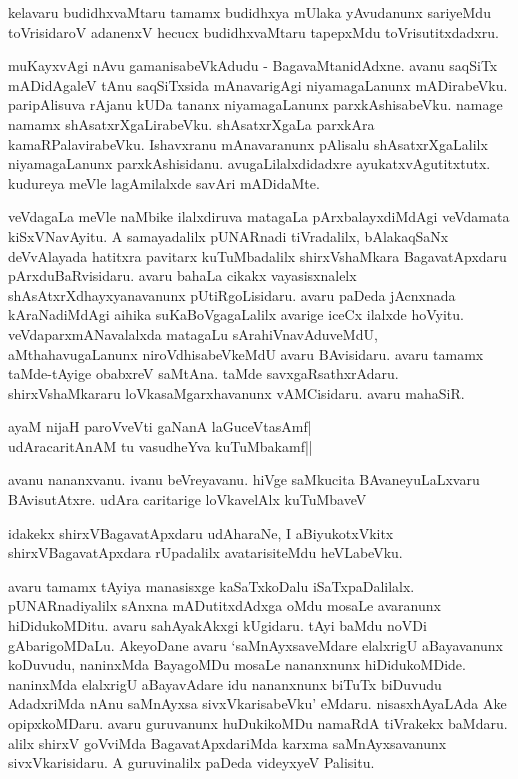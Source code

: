 kelavaru budidhxvaMtaru tamamx budidhxya mUlaka yAvudanunx sariyeMdu toVrisidaroV adanenxV hecucx budidhxvaMtaru tapepxMdu toVrisutitxdadxru.

muKayxvAgi nAvu gamanisabeVkAdudu - BagavaMtanidAdxne. avanu saqSiTx mADidAgaleV tAnu saqSiTxsida mAnavarigAgi niyamagaLanunx mADirabeVku. paripAlisuva rAjanu kUDa tananx niyamagaLanunx parxkAshisabeVku. namage namamx shAsatxrXgaLirabeVku. shAsatxrXgaLa parxkAra kamaRPalavirabeVku. Ishavxranu mAnavaranunx pAlisalu shAsatxrXgaLalilx niyamagaLanunx parxkAshisidanu. avugaLilalxdidadxre ayukatxvAgutitxtutx. kudureya meVle lagAmilalxde savAri mADidaMte.

veVdagaLa meVle naMbike ilalxdiruva matagaLa pArxbalayxdiMdAgi veVdamata kiSxVNavAyitu. A samayadalilx pUNARnadi tiVradalilx, bAlakaqSaNx deVvAlayada hatitxra pavitarx kuTuMbadalilx shirxVshaMkara BagavatApxdaru pArxduBaRvisidaru. avaru bahaLa cikakx vayasisxnalelx shAsAtxrXdhayxyanavanunx pUtiRgoLisidaru. avaru paDeda jAcnxnada kAraNadiMdAgi aihika suKaBoVgagaLalilx avarige iceCx ilalxde hoVyitu. veVdaparxmANavalalxda matagaLu sArahiVnavAduveMdU, aMthahavugaLanunx niroVdhisabeVkeMdU avaru BAvisidaru. avaru tamamx taMde-tAyige obabxreV saMtAna. taMde savxgaRsathxrAdaru. shirxVshaMkararu loVkasaMgarxhavanunx vAMCisidaru. avaru mahaSiR.

\begin{shloka}
ayaM nijaH paroVveVti gaNanA laGuceVtasAmf|\\
udAracaritAnAM tu vasudheYva kuTuMbakamf||
\end{shloka}

avanu nananxvanu. ivanu beVreyavanu. hiVge saMkucita BAvaneyuLaLxvaru BAvisutAtxre. udAra caritarige loVkavelAlx kuTuMbaveV

idakekx shirxVBagavatApxdaru udAharaNe, I aBiyukotxVkitx shirxVBagavatApxdara rUpadalilx avatarisiteMdu heVLabeVku.

avaru tamamx tAyiya manasisxge kaSaTxkoDalu iSaTxpaDalilalx. pUNARnadiyalilx sAnxna mADutitxdAdxga oMdu mosaLe avaranunx hiDidukoMDitu. avaru sahAyakAkxgi kUgidaru. tAyi baMdu noVDi gAbarigoMDaLu. AkeyoDane avaru `saMnAyxsaveMdare elalxrigU aBayavanunx koDuvudu, naninxMda BayagoMDu mosaLe nananxnunx hiDidukoMDide. naninxMda elalxrigU aBayavAdare idu nananxnunx biTuTx biDuvudu AdadxriMda nAnu saMnAyxsa sivxVkarisabeVku' eMdaru. nisasxhAyaLAda Ake opipxkoMDaru. avaru guruvanunx huDukikoMDu namaRdA tiVrakekx baMdaru. alilx shirxV goVviMda BagavatApxdariMda karxma saMnAyxsavanunx sivxVkarisidaru. A guruvinalilx paDeda videyxyeV Palisitu.

